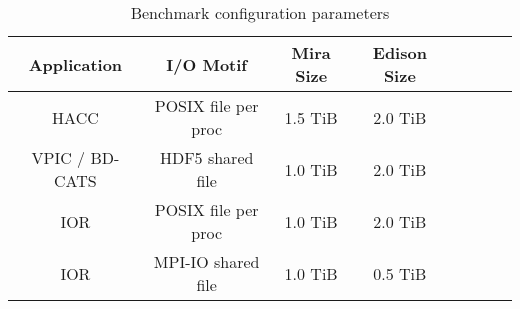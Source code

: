 \begin{table}[t]
\vspace{-.2in}
\footnotesize
\centering
\caption{Benchmark configuration parameters}
\vspace{-.1in}
\label{tab:bench-config}
\begin{tabular}{|c|c|c|c|c|c|c|c|}
\hline
\textbf{Application} & \textbf{I/O Motif} & \textbf{Mira Size} & \textbf{Edison Size} \\
\hline
HACC & POSIX file per proc & 1.5 TiB & 2.0 TiB \\
\hline
VPIC / BD-CATS & HDF5 shared file & 1.0 TiB & 2.0 TiB\\
\hline
IOR & POSIX file per proc & 1.0 TiB & 2.0 TiB\\
\hline
IOR & MPI-IO shared file & 1.0 TiB & 0.5 TiB\\
\hline
\end{tabular}
\normalsize
\vspace{-.2in}
\end{table}
